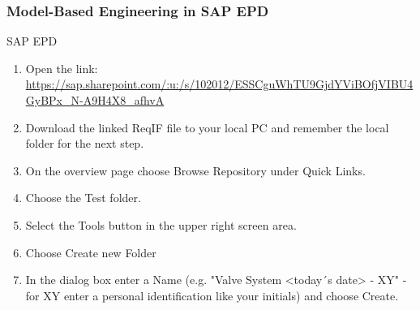 \newpage 

\begin{frame}
\frametitle{Model-Based Engineering in SAP EPD}
\begin{block}{SAP EPD}



\begin{enumerate}
\item  Open the link:   
\url{https://sap.sharepoint.com/:u:/s/102012/ESSCguWhTU9GjdYViBOfjVIBU4GyBPx_N-A9H4X8_afhvA}

\item  Download the linked ReqIF file to your local PC and remember the local folder for the next step.



\item  On the overview page choose Browse Repository under Quick Links.

\item  Choose the Test folder.

\item Select the Tools button in the upper right screen area.



\item  Choose Create new Folder

\item  In the dialog box enter a Name (e.g. "Valve System <today´s date> - XY" - for XY enter a personal identification like your initials) and choose Create.


\end{enumerate}
\end{block}
\end{frame}


\newpage 


